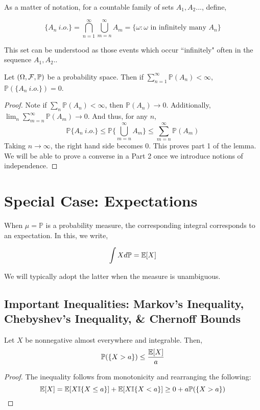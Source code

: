     \begin{definition} 
        As a matter of notation, for a countable family of sets $A_1,A_2...$, define, 

        \[ \{A_n \: i.o. \} = \bigcap_{n=1}^\infty \bigcup_{m=n}^\infty A_m = \{ \omega : \omega \text{ in infinitely many } A_n \} \]

        This set can be understood as those events which occur ``infinitely" often in the sequence $A_1,A_2..$
    \end{definition}
    \begin{lemma}
        Let $(\Omega, \mathcal F, \mathbb P)$ be a probability space. Then if 
        $\sum_{n=1}^\infty \mathbb P(A_n) < \infty$, $\mathbb P(\{A_n \: i.o.\}) = 0$.
    \end{lemma}

    \begin{proof}
        Note if $\sum_n \mathbb P(A_n) < \infty$, then $\mathbb P(A_n) \to 0$. Additionally, 
        $\lim_n \sum_{m=n}^\infty \mathbb P(A_m) \to 0$. And thus, for any $n$,
        \[ \mathbb P\{A_n \: i.o.\} \leq \mathbb P\{\bigcup_{m=n}^\infty A_m\} \leq \sum_{m = n}^\infty \mathbb P(A_m) \]
        Taking $n \to \infty$, the right hand side becomes $0$. This proves part 1 of the lemma. We will 
        be able to prove a converse in a Part 2 once we introduce notions of independence.
    \end{proof}

    \section{Special Case: Expectations}

    When $\mu = \mathbb P$ is a probability measure, the corresponding integral corresponds to an expectation. 
    In this, we write, 

    \[ \int X d\mathbb P = \mathbb E[X] \]

    We will typically adopt the latter when the measure is unambiguous. 

    \subsection{Important Inequalities: Markov's Inequality, Chebyshev's Inequality, \& Chernoff Bounds}

    \begin{theorem}\label{thm:markov_inequality}
        Let $X$ be nonnegative almost everywhere and integrable. Then, 
        \[ \mathbb P(\{X > a\}) \leq \frac{\mathbb E[X]}{a} \]
    \end{theorem}
    \begin{proof}
        The inequality follows from monotonicity and rearranging the following:
        \[ \mathbb E[X] = \mathbb E[X\mathbb I\{X \leq a\}] + \mathbb E[X\mathbb I\{X < a\}] \geq 0 + a \mathbb P(\{X > a\})\]
    \end{proof}

